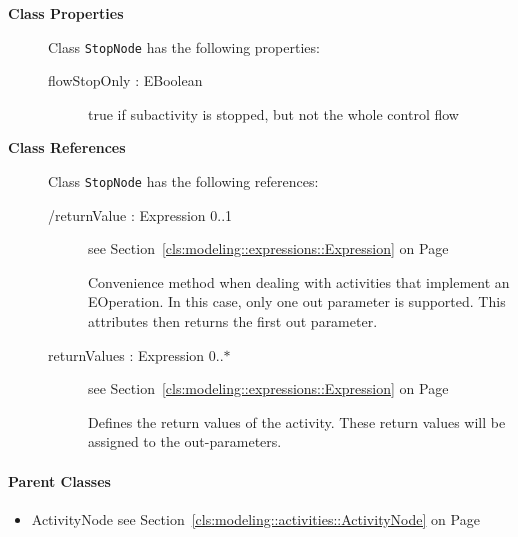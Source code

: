 \begin{description}

	\item[\textbf{Class Properties}] Class \texttt{StopNode} has the following properties:
	\begin{description}
\item[flowStopOnly : EBoolean 	]
\hspace{\fill}
\nopagebreak


	
			
true if subactivity is stopped, but not the whole control flow	
		
	
	\end{description}
	
	\item[\textbf{Class References}] Class \texttt{StopNode} has the following references:
	\begin{description}
\item[/returnValue : Expression 			0..1]
see Section~\ref{cls:modeling::expressions::Expression} on Page~\pageref{cls:modeling::expressions::Expression}\hspace{\fill}
\nopagebreak


	
			
Convenience method when dealing with activities that implement an EOperation. In this case, only one out parameter is supported. This attributes then returns the first out parameter.	
		
	
\item[returnValues : Expression 			0..$*$]
see Section~\ref{cls:modeling::expressions::Expression} on Page~\pageref{cls:modeling::expressions::Expression}\hspace{\fill}
\nopagebreak


	
			
Defines the return values of the activity. These return values will be assigned to the out-parameters.	
		
	
	\end{description}
	

\end{description}

\paragraph{Parent Classes}
\begin{itemize}
\item ActivityNode see Section~\ref{cls:modeling::activities::ActivityNode} on Page~\pageref{cls:modeling::activities::ActivityNode}\end{itemize}
